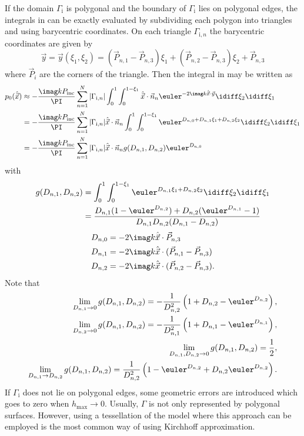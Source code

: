 If the domain $\Gamma_{\mathrm{i}}$ is polygonal and the boundary of $\Gamma_{\mathrm{i}}$ lies on polygonal edges, the integrals in  can be exactly evaluated by subdividing each polygon into triangles and using barycentric coordinates. On each triangle $\Gamma_{\mathrm{i},n}$ the barycentric coordinates are given by
\begin{equation}\label{Eq4:y_xi}
	\vec{y} = \vec{y}(\xi_1,\xi_2) = (\vec{P}_{n,1}-\vec{P}_{n,3})\xi_1 + (\vec{P}_{n,2}-\vec{P}_{n,3})\xi_2 + \vec{P}_{n,3}
\end{equation}
where $\vec{P}_i$ are the corners of the triangle. Then the integral in  may be written as
\begin{align}
	p_0(\hat{\vec{x}}) &\approx -\frac{\imag kP_{\mathrm{inc}}}{\PI}\sum_{n=1}^N|\Gamma_{\mathrm{i},n}|\int_0^1\int_0^{1-\xi_1} \hat{\vec{x}}\cdot\vec{n}_n\euler^{-2\imag k \hat{\vec{x}}\cdot\vec{y}}\idiff \xi_2\idiff\xi_1\nonumber \\
	&= -\frac{\imag kP_{\mathrm{inc}}}{\PI}\sum_{n=1}^N|\Gamma_{\mathrm{i},n}|\hat{\vec{x}}\cdot\vec{n}_n\int_0^1\int_0^{1-\xi_1} \euler^{D_{n,0}+D_{n,1}\xi_1+D_{n,2}\xi_2}\idiff \xi_2\idiff\xi_1\nonumber \\\label{Eq4:polygonalApprox}
	&= -\frac{\imag kP_{\mathrm{inc}}}{\PI}\sum_{n=1}^N|\Gamma_{\mathrm{i},n}|\hat{\vec{x}}\cdot\vec{n}_ng(D_{n,1},D_{n,2})\euler^{D_{n,0}}
\end{align}
with
\begin{align*}
	g(D_{n,1},D_{n,2}) &= \int_0^1\int_0^{1-\xi_1} \euler^{D_{n,1}\xi_1+D_{n,2}\xi_2}\idiff \xi_2\idiff\xi_1 \\
	&= \frac{D_{n,1}(1-\euler^{D_{n,2}})+D_{n,2}(\euler^{D_{n,1}}-1)}{D_{n,1}D_{n,2}(D_{n,1}-D_{n,2})}
\end{align*}
\begin{align*}
	D_{n,0} &= -2\imag k\hat{\vec{x}}\cdot \vec{P}_{n,3}\\
	D_{n,1} &= -2\imag k\hat{\vec{x}}\cdot (\vec{P}_{n,1} - \vec{P}_{n,3})\\
	D_{n,2} &= -2\imag k\hat{\vec{x}}\cdot (\vec{P}_{n,2} - \vec{P}_{n,3}).
\end{align*}
Note that
\begin{align*}
	\lim_{D_{n,1}\to 0} g(D_{n,1},D_{n,2}) = -\frac{1}{D_{n,2}^2}\left(1+D_{n,2}-\euler^{D_{n,2}}\right),\\
	\lim_{D_{n,2}\to 0} g(D_{n,1},D_{n,2}) = -\frac{1}{D_{n,1}^2}\left(1+D_{n,1}-\euler^{D_{n,1}}\right),\\
	\lim_{D_{n,1},D_{n,2}\to 0} g(D_{n,1},D_{n,2}) = \frac{1}{2},\\
	\lim_{D_{n,1}\to D_{n,2}} g(D_{n,1},D_{n,2}) = \frac{1}{D_{n,2}^2}\left(1-\euler^{D_{n,2}}+D_{n,2}\euler^{D_{n,2}}\right).
\end{align*}
If $\Gamma_{\mathrm{i}}$ does not lie on polygonal edges, some geometric errors are introduced which goes to zero when $h_{\mathrm{max}}\to 0$. Usually, $\Gamma$ is not only represented by polygonal surfaces. However, using a tessellation of the model where this approach can be employed is the most common way of using Kirchhoff approximation.